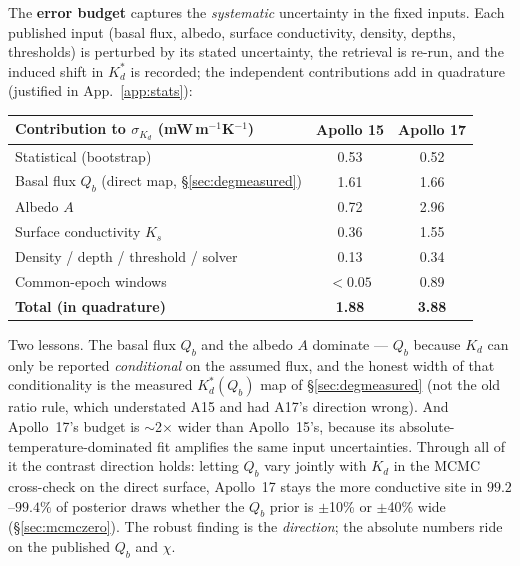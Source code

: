 \documentclass[11pt]{report}
\begin{document}
\noindent The \textbf{error budget} captures the \emph{systematic} uncertainty in
the fixed inputs. Each published input (basal flux, albedo, surface
conductivity, density, depths, thresholds) is perturbed by its stated
uncertainty, the retrieval is re-run, and the induced shift in $K_d^{*}$ is
recorded; the independent contributions add in quadrature (justified in
App.~\ref{app:stats}):

\begin{center}\small
\begin{tabular}{@{}lcc@{}}
\toprule
Contribution to $\sigma_{K_d}$ (mW\,m$^{-1}$K$^{-1}$) & Apollo 15 & Apollo 17 \\
\midrule
Statistical (bootstrap)        & 0.53 & 0.52 \\
Basal flux $Q_b$ (direct map, \S\ref{sec:degmeasured}) & 1.61 & 1.66 \\
Albedo $A$                     & 0.72 & 2.96 \\
Surface conductivity $K_s$     & 0.36 & 1.55 \\
Density / depth / threshold / solver & 0.13 & 0.34 \\
Common-epoch windows               & $<0.05$ & 0.89 \\
\midrule
\textbf{Total (in quadrature)} & \textbf{1.88} & \textbf{3.88} \\
\bottomrule
\end{tabular}
\end{center}

\noindent Two lessons. The basal flux $Q_b$ and the albedo $A$ dominate ---
$Q_b$ because $K_d$ can only be reported \emph{conditional} on the assumed
flux, and the honest width of that conditionality is the measured
$K_d^{*}(Q_b)$ map of \S\ref{sec:degmeasured} (not the old ratio rule,
which understated A15 and had A17's direction wrong). And Apollo~17's
budget is $\sim$2$\times$ wider than Apollo~15's, because its
absolute-temperature-dominated fit amplifies the same input
uncertainties. Through all of it the contrast direction holds: letting
$Q_b$ vary jointly with $K_d$ in the MCMC cross-check on the direct
surface, Apollo~17 stays the more conductive site in $99.2$--$99.4\%$ of
posterior draws whether the $Q_b$ prior is $\pm$10\% or $\pm$40\% wide
(\S\ref{sec:mcmczero}). The robust finding is the \emph{direction}; the
absolute numbers ride on the published $Q_b$ and $\chi$.
\end{document}
